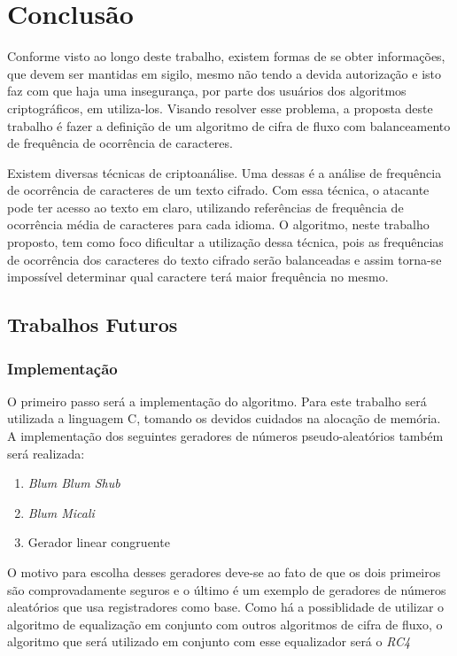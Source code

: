 \chapter{Conclusão}
\label{conclusion}


Conforme visto ao longo deste trabalho, existem formas de se obter informações, que devem ser mantidas em sigilo, mesmo não tendo a devida autorização e isto faz com que haja uma insegurança, por parte dos usuários dos algoritmos criptográficos, em utiliza-los. Visando resolver esse problema, a proposta deste trabalho é fazer a definição de um algoritmo de cifra de fluxo com balanceamento de frequência de ocorrência de caracteres.

Existem diversas técnicas de criptoanálise. Uma dessas é a análise de frequência de ocorrência de caracteres de um texto cifrado. Com essa técnica, o atacante pode ter acesso ao texto em claro, utilizando referências de frequência de ocorrência média de caracteres para cada idioma. O algoritmo, neste trabalho proposto, tem como foco dificultar a utilização dessa técnica, pois as frequências de ocorrência dos caracteres do texto cifrado serão balanceadas e assim torna-se impossível determinar qual caractere terá maior frequência no mesmo.

\section{Trabalhos Futuros}
\label{future-work}

	\subsection{Implementação}
	\label{implementation}
	
	O primeiro passo será a implementação do algoritmo. Para este trabalho será utilizada a linguagem C, tomando os devidos cuidados na alocação de memória. 
	A implementação dos seguintes geradores de números pseudo-aleatórios também será realizada:
		\begin{enumerate}
			\item \textit{Blum Blum Shub}
			\item \textit{Blum Micali}
			\item Gerador linear congruente 
		\end{enumerate}		 
	O motivo para escolha desses geradores deve-se ao fato de que os dois primeiros são comprovadamente seguros e o último é um exemplo de geradores de números aleatórios que usa registradores como base. 
	Como há a possiblidade de utilizar o algoritmo de equalização em conjunto com outros algoritmos de cifra de fluxo, o algoritmo que será utilizado em conjunto com esse equalizador será o \textit{RC4}
	
